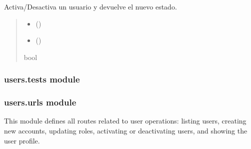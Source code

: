 \documentclass[a4paper,11pt,spanish]{sphinxmanual}
\begin{document}
\begin{fulllineitems}
\label{\detokenize{api/users/users.services:users.services.toggle_active}}
\pysigstartsignatures
\pysiglinewithargsret
{}
{\sphinxparamcomma {}\sphinxparamcomma {}}
{}
\pysigstopsignatures
\sphinxAtStartPar
Activa/Desactiva un usuario y devuelve el nuevo estado.
\begin{quote}\begin{description}
\begin{itemize}
\item {} 
\sphinxAtStartPar
{} ()

\item {} 
\sphinxAtStartPar
{} ()

\end{itemize}

\sphinxAtStartPar
bool

\end{description}\end{quote}

\end{fulllineitems}


\sphinxstepscope


\subsubsection{users.tests module}
\label{\detokenize{api/users/users.tests:module-users.tests}}\label{\detokenize{api/users/users.tests:users-tests-module}}\label{\detokenize{api/users/users.tests::doc}}
\sphinxstepscope


\subsubsection{users.urls module}
\label{\detokenize{api/users/users.urls:module-users.urls}}\label{\detokenize{api/users/users.urls:users-urls-module}}\label{\detokenize{api/users/users.urls::doc}}
\sphinxAtStartPar
This module defines all routes related to user operations:
listing users, creating new accounts, updating roles,
activating or deactivating users, and showing the user profile.
\end{document}
